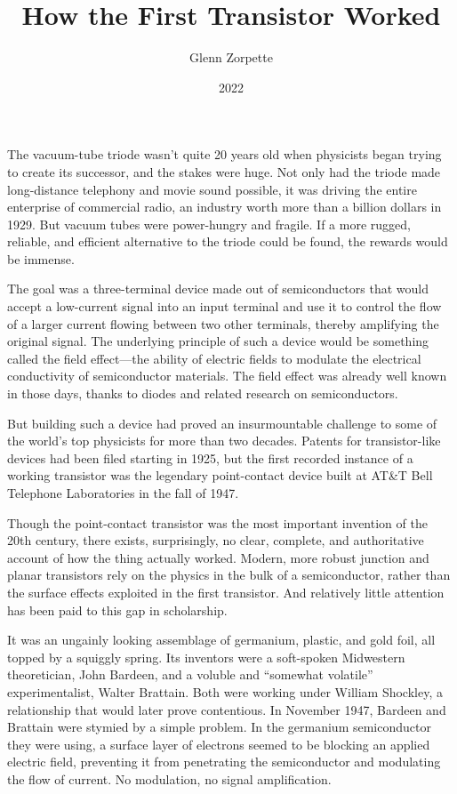 \documentclass[12pt]{article}
\title{How the First Transistor Worked}
\author{Glenn Zorpette}
\date{2022}
\begin{document}
\maketitle

The vacuum-tube triode wasn’t quite 20 years old when physicists began trying to create its successor, and the stakes were huge. Not only had the triode made long-distance telephony and movie sound possible, it was driving the entire enterprise of commercial radio, an industry worth more than a billion dollars in 1929. But vacuum tubes were power-hungry and fragile. If a more rugged, reliable, and efficient alternative to the triode could be found, the rewards would be immense.

The goal was a three-terminal device made out of semiconductors that would accept a low-current signal into an input terminal and use it to control the flow of a larger current flowing between two other terminals, thereby amplifying the original signal. The underlying principle of such a device would be something called the field effect---the ability of electric fields to modulate the electrical conductivity of semiconductor materials. The field effect was already well known in those days, thanks to diodes and related research on semiconductors.

But building such a device had proved an insurmountable challenge to some of the world’s top physicists for more than two decades. Patents for transistor-like devices had been filed starting in 1925, but the first recorded instance of a working transistor was the legendary point-contact device built at AT\&T Bell Telephone Laboratories in the fall of 1947.

Though the point-contact transistor was the most important invention of the 20th century, there exists, surprisingly, no clear, complete, and authoritative account of how the thing actually worked. Modern, more robust junction and planar transistors rely on the physics in the bulk of a semiconductor, rather than the surface effects exploited in the first transistor. And relatively little attention has been paid to this gap in scholarship.

It was an ungainly looking assemblage of germanium, plastic, and gold foil, all topped by a squiggly spring. Its inventors were a soft-spoken Midwestern theoretician, John Bardeen, and a voluble and ``somewhat volatile'' experimentalist, Walter Brattain. Both were working under William Shockley, a relationship that would later prove contentious. In November 1947, Bardeen and Brattain were stymied by a simple problem. In the germanium semiconductor they were using, a surface layer of electrons seemed to be blocking an applied electric field, preventing it from penetrating the semiconductor and modulating the flow of current. No modulation, no signal amplification.
\end{document}
